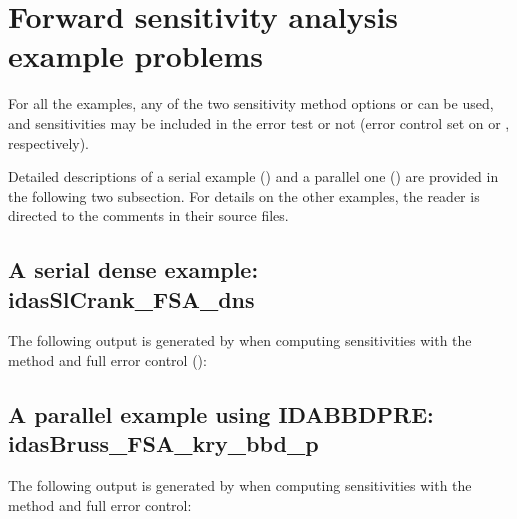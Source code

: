 \section{Forward sensitivity analysis example problems}\label{s:fwd_ex}

For all the {\idas} examples, any of the two sensitivity method options
 or  can be used, 
and sensitivities may be included in the error test or not 
(error control set on  or , respectively).

Detailed descriptions of a serial example () 
and a parallel one () are provided in the following
two subsection.
For details on the other examples, the reader is directed to the comments in
their source files.

\subsection{A serial dense example: idasSlCrank\_FSA\_dns}
\label{ss:idasSlCrank_FSA_dns}


The following output is generated by  when computing
sensitivities with the  method and full error
control ():



\newpage
\subsection{A parallel example using IDABBDPRE: idasBruss\_FSA\_kry\_bbd\_p}
\label{ss:idasBruss_FSA_kry_bbd_p}


The following output is generated by  when computing
sensitivities with the  method and full error
control:

\noindent
{}

